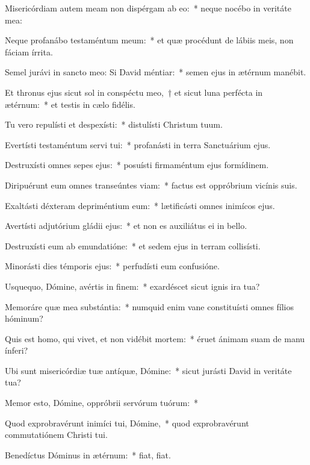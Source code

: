 \item Misericórdiam autem meam non dispérgam ab eo:~* neque nocébo in veritáte mea:

\item Neque profanábo testaméntum meum:~* et quæ procédunt de lábiis meis, non fáciam írrita.

\item Semel jurávi in sancto meo: Si David méntiar:~* semen ejus in ætérnum manébit.

\item Et thronus ejus sicut sol in conspéctu meo,~† et sicut luna perfécta in ætérnum:~* et testis in cælo fidélis.

\item Tu vero repulísti et despexísti:~* distulísti Christum tuum.

\item Evertísti testaméntum servi tui:~* profanásti in terra Sanctuárium ejus.

\item Destruxísti omnes sepes ejus:~* posuísti firmaméntum ejus formídinem.

\item Diripuérunt eum omnes transeúntes viam:~* factus est oppróbrium vicínis suis.

\item Exaltásti déxteram depriméntium eum:~* lætificásti omnes inimícos ejus.

\item Avertísti adjutórium gládii ejus:~* et non es auxiliátus ei in bello.

\item Destruxísti eum ab emundatióne:~* et sedem ejus in terram collisísti.

\item Minorásti dies témporis ejus:~* perfudísti eum confusióne.

\item Usquequo, Dómine, avértis in finem:~* exardéscet sicut ignis ira tua?

\item Memoráre quæ mea substántia:~* numquid enim vane constituísti omnes fílios hóminum?

\item Quis est homo, qui vivet, et non vidébit mortem:~* éruet ánimam suam de manu ínferi?

\item Ubi sunt misericórdiæ tuæ antíquæ, Dómine:~* sicut jurásti David in veritáte tua?

\item Memor esto, Dómine, oppróbrii servórum tuórum:~*

\item Quod exprobravérunt inimíci tui, Dómine,~* quod exprobravérunt commutatiónem Christi tui.

\item Benedíctus Dóminus in ætérnum:~* fiat, fiat.

